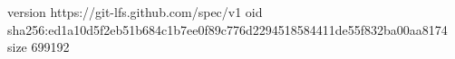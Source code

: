 version https://git-lfs.github.com/spec/v1
oid sha256:ed1a10d5f2eb51b684c1b7ee0f89c776d2294518584411de55f832ba00aa8174
size 699192
